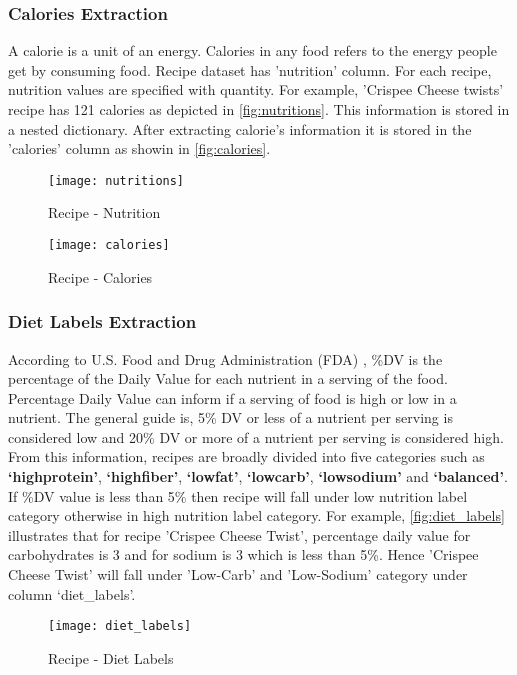 \subsubsection{Calories Extraction}
A calorie is a unit of an energy. Calories in any food refers to the energy people get by consuming food. Recipe dataset has 'nutrition' column. For each recipe, nutrition values are specified with quantity. For example, 'Crispee Cheese twists' recipe has 121 calories as depicted in  \autoref{fig:nutritions}. This information is stored in a nested dictionary. After extracting calorie's information it is stored in the 'calories' column as showin in \autoref{fig:calories}.
\begin{singlespace}
\begin{figure}[H]
	\centering
	\texttt{[image: nutritions]}
	\caption{Recipe - Nutrition }
	\label{fig:nutritions}
\end{figure}  
\end{singlespace}
\begin{singlespace}
\begin{figure}[H]
	\centering
	\texttt{[image: calories]}
	\caption{Recipe - Calories }
	\label{fig:calories}
\end{figure}  
\end{singlespace}

\subsubsection{Diet Labels Extraction}
\label{sec:diet_labels}
According to U.S. Food and Drug Administration (FDA) \cite{51}, \%DV is the percentage of the Daily Value for each nutrient in a serving of the food. Percentage Daily Value can inform if a serving of food is high or low in a nutrient. The general guide is, 5\% DV or less of a nutrient per serving is considered low and 20\% DV or more of a nutrient per serving is considered high. From this information, recipes are broadly divided into five categories such as \textbf{`highprotein'}, \textbf{`highfiber'}, \textbf{`lowfat'}, \textbf{`lowcarb'}, \textbf{`lowsodium'} and \textbf{`balanced'}. If \%DV value is less than 5\% then recipe will fall under low nutrition label category otherwise in high nutrition label category. For example, \autoref{fig:diet_labels} illustrates that for recipe 'Crispee Cheese Twist', percentage daily value for carbohydrates is $3$ and for sodium is $3$ which is less than 5\%. Hence 'Crispee Cheese Twist' will fall under 'Low-Carb' and 'Low-Sodium' category under column `diet\_labels'.
\begin{singlespace}
\begin{figure}[H]
	\centering
	\texttt{[image: diet\_labels]}
	\caption{Recipe - Diet Labels }
	\label{fig:diet_labels}
\end{figure}  
\end{singlespace}

